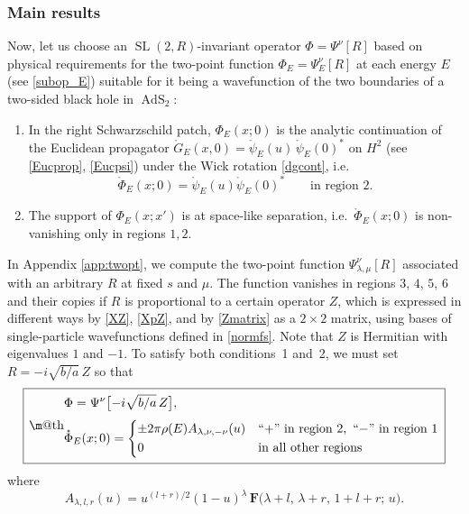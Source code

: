 \documentclass[12pt]{article}
\makeatletter
\newcommand{\be}{\begin{equation}}
\newcommand{\ee}{\end{equation}}
\newcommand*{\wideboxed}[1]{\setlength{\fboxsep}{1ex}%
  \fbox{\m@th$\displaystyle#1$}}
\newcommand{\hgfs}{\mathbf{F}}
\newcommand{\RR}{\mathbb{R}}
\DeclareMathOperator{\tSL}{\widetilde{\mathrm{SL}}}
\DeclareMathOperator{\tAdS}{\widetilde{AdS}}
\DeclareMathOperator{\HH}{H}
\newcommand{\rpsi}{\mathring{\psi}}
\newcommand{\rG}{\mathring{G}}
\newcommand{\lam}{\lambda}
\def\ie{i.e.\ }
\def\widetilde#1{#1}%
\def\HH{H}
\def\RR{R}
\makeatother
\begin{document}
\subsubsection{Main results}\label{sec_tswf}

Now, let us choose an $\tSL(2,\RR)$-invariant operator $\Phi=\Psi^{\nu}[R]$ based on physical requirements for the two-point function $\Phi_E=\Psi^{\nu}_E[R]$ at each energy $E$ (see \eqref{subop_E}) suitable for it being a wavefunction of the two boundaries of a two-sided black hole in $\tAdS_2$:

\begin{enumerate}

\item
In the right Schwarzschild patch, $\Phi_E(x;0)$ is the analytic continuation of the Euclidean propagator $\rG_E(x,0)=\rpsi_E(u)\,\rpsi_E(0)^*$ on $\HH^2$ (see \eqref{Eucprop}, \eqref{Eucpsi}) under the Wick rotation \eqref{dgcont}, \ie
\be \label{match}
\mathring{\Phi}_E(x;0)=\mathring{\psi}_E(u)\mathring{\psi}_E(0)^* \qquad \text{in region $2$.}
\ee

\item
The support of $\Phi_E(x;x')$ is at space-like separation, \ie $\mathring{\Phi}_E(x;0)$ is non-vanishing only in regions $1,2$.

\end{enumerate}
In Appendix \ref{app:twopt}, we compute the  two-point function $\Psi^{\nu}_{\lam, \mu}[R]$ associated with an arbitrary $R$ at fixed $s$ and $\mu$. The function vanishes in regions $3$, $4$, $5$, $6$ and their copies if $R$ is proportional to a certain operator $Z$, which is expressed in different ways by \eqref{XZ}, \eqref{XpZ}, and by \eqref{Zmatrix} as a $2\times 2$ matrix, using bases of single-particle wavefunctions defined in \eqref{normfs}. Note that $Z$ is Hermitian with eigenvalues $1$ and $-1$. To satisfy both conditions~1 and~2, we must set $R=-i \sqrt{b/a}\,Z$ so that 
\be \label{Phi}
\wideboxed{\begin{aligned}
&\Phi=\Psi^{\nu}\bigl[-i \sqrt{b/a}\,Z\bigr],\\[3pt]
&\mathring{\Phi}_E(x;0)=\begin{dcases}
\pm 2\pi\rho(E) A_{\lam, \nu, -\nu}(u) & \text{``$+$'' in region $2$,\, ``$-$'' in region $1$}\\
0 & \text{in all other regions}
\end{dcases}
\end{aligned}}
\ee
where 
\begin{equation} \label{MAf}
A_{\lambda,l,r}(u)=u^{(l+r)/2}(1-u)^{\lambda}\,
\hgfs\bigl(\lambda+l,\,\lambda+r,\,1+l+r;\,u\bigr).
\end{equation}
\end{document}
